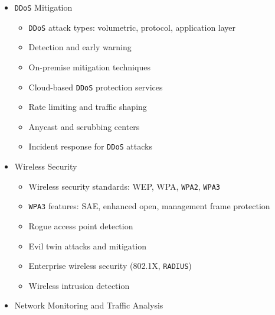 \documentclass[
]{article}
\providecommand{\tightlist}{%
  \setlength{\itemsep}{0pt}\setlength{\parskip}{0pt}}
\begin{document}
\begin{itemize}
  \begin{itemize}
  \tightlist
  \item
    Zero trust principles: never trust, always verify
  \item
    Identity-based access control
  \item
    Device trust and posture assessment
  \item
    Continuous verification and least privilege
  \item
    Zero trust network access (\texttt{ZTNA})
  \item
    Implementing zero trust with existing infrastructure
  \item
    \texttt{BeyondCorp} and similar frameworks
  \end{itemize}
\item
  \texttt{DDoS} Mitigation

  \begin{itemize}
  \tightlist
  \item
    \texttt{DDoS} attack types: volumetric, protocol, application layer
  \item
    Detection and early warning
  \item
    On-premise mitigation techniques
  \item
    Cloud-based \texttt{DDoS} protection services
  \item
    Rate limiting and traffic shaping
  \item
    Anycast and scrubbing centers
  \item
    Incident response for \texttt{DDoS} attacks
  \end{itemize}
\item
  Wireless Security

  \begin{itemize}
  \tightlist
  \item
    Wireless security standards: WEP, WPA, \texttt{WPA2}, \texttt{WPA3}
  \item
    \texttt{WPA3} features: SAE, enhanced open, management frame
    protection
  \item
    Rogue access point detection
  \item
    Evil twin attacks and mitigation
  \item
    Enterprise wireless security (802.1X, \texttt{RADIUS})
  \item
    Wireless intrusion detection
  \end{itemize}
\item
  Network Monitoring and Traffic Analysis


\end{itemize}
\end{document}

